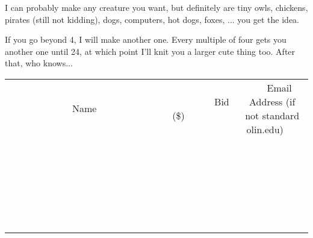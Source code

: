 \documentclass[11pt]{article}
\begin{document}
I can probably make any creature you want, but definitely are tiny owls, chickens, pirates (still not kidding), dogs, computers, hot dogs, foxes, ... you get the idea. 

If you go beyond 4, I will make another one. Every multiple of four gets you another one until 24, at which point I'll knit you a larger cute thing too. After that, who knows...
\\[6ex]
\begin{tabular}{c c c}
~~~~~~~~~~~~~Name~~~~~~~~~~~~~ & ~~~~~~~~~Bid (\$)~~~~~~~~~  & ~~~Email Address (if not standard olin.edu)~~~\\
 & & \\
\hline
 & & \\
\hline
 & & \\
\hline
 & & \\
\hline
 & & \\
\hline
 & & \\
\hline
 & & \\
\hline
 & & \\
\hline
 & & \\
\hline
 & & \\
\hline
 & & \\
\hline
 & & \\
\hline
 & & \\
\hline
 & & \\
\hline
 & & \\
\hline
 & & \\
\hline
 & & \\
\hline
 & & \\
\hline
 & & \\
\hline
 & & \\
\hline
 & & \\
\hline
 & & \\
\hline
 & & \\
\hline
 & & \\
\hline
 & & \\
\hline
 & & \\
\hline
\end{tabular}
\newpage
\end{document}
